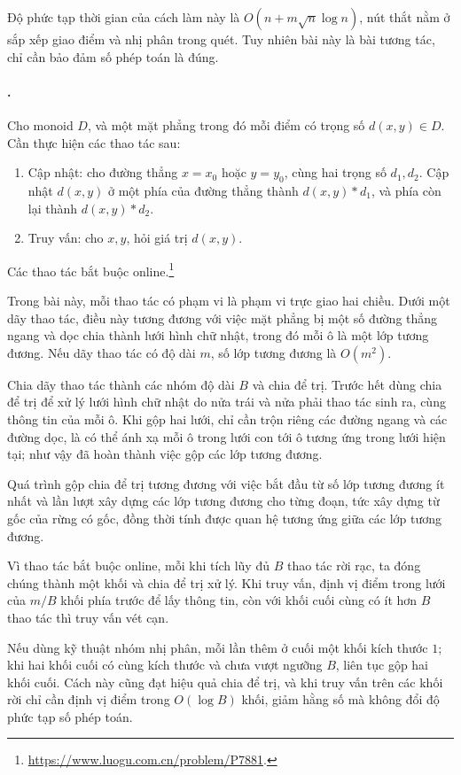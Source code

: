 \documentclass[11pt]{article}
\begin{document}
Độ phức tạp thời gian của cách làm này là \(O(n+m\sqrt n\log n)\), nút thắt
nằm ở sắp xếp giao điểm và nhị phân trong quét. Tuy nhiên bài này là bài tương
tác, chỉ cần bảo đảm số phép toán là đúng.

\paragraph{.}

Cho monoid \(D\), và một mặt phẳng trong đó mỗi điểm có trọng số
\(d(x,y)\in D\). Cần thực hiện các thao tác sau:
\begin{enumerate}
  \item Cập nhật: cho đường thẳng \(x=x_0\) hoặc \(y=y_0\), cùng hai trọng số
  \(d_1,d_2\). Cập nhật \(d(x,y)\) ở một phía của đường thẳng thành
  \(d(x,y)*d_1\), và phía còn lại thành \(d(x,y)*d_2\).
  \item Truy vấn: cho \(x,y\), hỏi giá trị \(d(x,y)\).
\end{enumerate}
Các thao tác bắt buộc online.\footnote{\url{https://www.luogu.com.cn/problem/P7881}.}

Trong bài này, mỗi thao tác có phạm vi là phạm vi trực giao hai chiều. Dưới một
dãy thao tác, điều này tương đương với việc mặt phẳng bị một số đường thẳng
ngang và dọc chia thành lưới hình chữ nhật, trong đó mỗi ô là một lớp tương
đương. Nếu dãy thao tác có độ dài \(m\), số lớp tương đương là \(O(m^2)\).

Chia dãy thao tác thành các nhóm độ dài \(B\) và chia để trị. Trước hết dùng
chia để trị để xử lý lưới hình chữ nhật do nửa trái và nửa phải thao tác sinh
ra, cùng thông tin của mỗi ô. Khi gộp hai lưới, chỉ cần trộn riêng các đường
ngang và các đường dọc, là có thể ánh xạ mỗi ô trong lưới con tới ô tương ứng
trong lưới hiện tại; như vậy đã hoàn thành việc gộp các lớp tương đương.

Quá trình gộp chia để trị tương đương với việc bắt đầu từ số lớp tương đương ít
nhất và lần lượt xây dựng các lớp tương đương cho từng đoạn, tức xây dựng từ
gốc của rừng có gốc, đồng thời tính được quan hệ tương ứng giữa các lớp tương
đương.

Vì thao tác bắt buộc online, mỗi khi tích lũy đủ \(B\) thao tác rời rạc, ta
đóng chúng thành một khối và chia để trị xử lý. Khi truy vấn, định vị điểm
trong lưới của \(m/B\) khối phía trước để lấy thông tin, còn với khối cuối cùng
có ít hơn \(B\) thao tác thì truy vấn vét cạn.

Nếu dùng kỹ thuật nhóm nhị phân, mỗi lần thêm ở cuối một khối kích thước \(1\);
khi hai khối cuối có cùng kích thước và chưa vượt ngưỡng \(B\), liên tục gộp
hai khối cuối. Cách này cũng đạt hiệu quả chia để trị, và khi truy vấn trên các
khối rời chỉ cần định vị điểm trong \(O(\log B)\) khối, giảm hằng số mà không
đổi độ phức tạp số phép toán.
\end{document}
